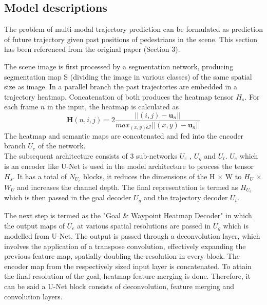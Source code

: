 \subsection{Model descriptions}

The problem of multi-modal trajectory prediction can be
formulated as prediction of future trajectory given past positions of pedestrians in the scene. This section has been referenced from the original paper \cite{mangalam2021goals} (Section 3).

The scene image is first processed by a segmentation network, producing segmentation map S (dividing the image in various classes) of the same spatial size as image. In a parallel branch the past trajectories are embedded in a trajectory heatmap. Concatenation of both produces the heatmap tensor $H_{s}$. For each frame $n$ in the input, the heatmap is calculated as
\begin{equation}
    \mathbb{\textbf{H}}(n,i,j)= 2{\frac{||(i,j)-\textbf{u}_n||}{{max}_{(x,y)\epsilon \mathcal{I}}||(x,y)-\textbf{u}_n||}}
\end{equation}
The heatmap and semantic maps are concatenated and fed into the encoder branch $U_e$ of the network.\\
The subsequent architecture consists of 3 sub-networks $U_{e}$ , $U_{g}$ and $U_{t}$. $U_{e}$ which is an encoder like U-Net \cite{DBLP:journals/corr/RonnebergerFB15} is used in the model architecture to process the tensor $H_{s}$. It has a total of $N_{U_{e}}$ blocks, it reduces the dimensions of the H × W to $H_{U}$ × $W_{U}$ and increases the channel depth. The final representation is termed as $H_{U_{e}}$ which is then passed in the goal decoder $U_{g}$ and the trajectory decoder $U_{t}$.

The next step is termed as the "Goal \& Waypoint Heatmap Decoder" in which the output maps of $U_{e}$ at various spatial resolutions are passed in $U_{g}$ which is modelled from U-Net. The output is passed through a deconvolution layer, which involves the application of a transpose convolution, effectively expanding the previous feature map, spatially doubling the resolution in every block. The encoder map from the respectively sized input layer is concatenated. To attain the final resolution of the goal, heatmap feature merging is done. Therefore, it can be said a U-Net block consists of deconvolution, feature merging and convolution layers. 

